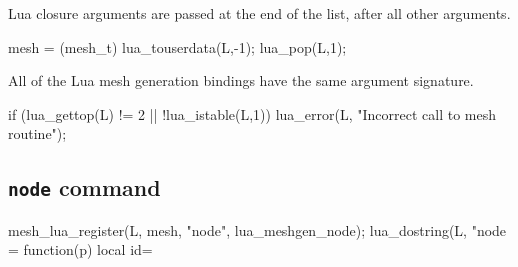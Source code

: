 \nwendcode{}\nwdocspar

Lua closure arguments are passed at the end of the list, after all other
arguments.

\nwenddocs{}\endmoddef
mesh = (mesh_t) lua_touserdata(L,-1);
lua_pop(L,1);

\nwendcode{}\nwdocspar

All of the Lua mesh generation bindings have the same argument
signature.

\nwenddocs{}\endmoddef
if (lua_gettop(L) != 2 || !lua_istable(L,1)) 
    lua_error(L, "Incorrect call to mesh routine");
\nwendcode{}\nwdocspar


\subsection{{\tt{}node} command}

\nwenddocs{}\endmoddef
mesh_lua_register(L, mesh, "node", lua_meshgen_node);
lua_dostring(L, 
"node = function(p) local id=%
\nwendcode{}\nwdocspar

